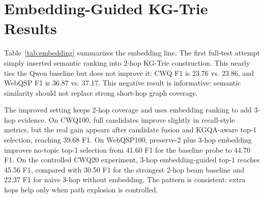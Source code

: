 \documentclass[10pt,twocolumn]{article}
\begin{document}
\section{Embedding-Guided KG-Trie Results}
\begin{table}[t]
\centering
\small
{}
\caption{Embedding-guided KG-Trie results. Pure 2-hop embedding selection is close to, but does not beat, the full Qwen baseline. It becomes useful when 2-hop coverage is preserved and 3-hop evidence is added with candidate reranking.}
\label{tab:embedding}
\end{table}

Table~\ref{tab:embedding} summarizes the embedding line. The first full-test attempt simply inserted semantic ranking into 2-hop KG-Trie construction. This nearly ties the Qwen baseline but does not improve it: CWQ F1 is 23.76 vs. 23.86, and WebQSP F1 is 36.87 vs. 37.17. This negative result is informative: semantic similarity should not replace strong short-hop graph coverage.

The improved setting keeps 2-hop coverage and uses embedding ranking to add 3-hop evidence. On CWQ100, full candidates improve slightly in recall-style metrics, but the real gain appears after candidate fusion and KGQA-aware top-1 selection, reaching 39.68 F1. On WebQSP100, preserve-2 plus 3-hop embedding improves no-topic top-1 selection from 41.60 F1 for the baseline probe to 44.70 F1. On the controlled CWQ20 experiment, 3-hop embedding-guided top-1 reaches 45.56 F1, compared with 30.50 F1 for the strongest 2-hop beam baseline and 22.37 F1 for naive 3-hop without embedding. The pattern is consistent: extra hops help only when path explosion is controlled.
\end{document}
